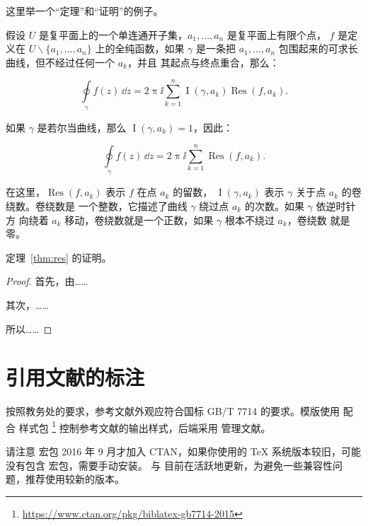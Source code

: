 \documentclass{sjtureport}
\begin{document}
这里举一个“定理”和“证明”的例子。
\begin{theorem}[留数定理]
\label{thm:res}
	假设 $U$ 是复平面上的一个单连通开子集，$a_1, \ldots, a_n$ 是复平面上有限个点，
	$f$ 是定义在 $U \backslash \{a_1, \ldots, a_n\}$ 上的全纯函数，如果 $\gamma$
	是一条把 $a_1, \ldots, a_n$ 包围起来的可求长曲线，但不经过任何一个 $a_k$，并且
	其起点与终点重合，那么：

	\begin{equation}
	\label{eq:res}
	\oint\limits_\gamma f(z)\, \dd z = 2\uppi \ii \sum_{k=1}^n \operatorname{I}(\gamma, a_k) \operatorname{Res}(f, a_k).
	\end{equation}

	如果 $\gamma$ 是若尔当曲线，那么 $\operatorname{I}(\gamma, a_k) = 1$，因此：

	\begin{equation}
	\label{eq:resthm}
	\oint\limits_\gamma f(z)\, \dd z = 2\uppi \ii \sum_{k=1}^n \operatorname{Res}(f, a_k).
	\end{equation}

	在这里，$\operatorname{Res}(f, a_k)$ 表示 $f$ 在点 $a_k$ 的留数，
	$\operatorname{I}(\gamma, a_k)$ 表示 $\gamma$ 关于点 $a_k$ 的卷绕数。卷绕数是
	一个整数，它描述了曲线 $\gamma$ 绕过点 $a_k$ 的次数。如果 $\gamma$ 依逆时针方
	向绕着 $a_k$ 移动，卷绕数就是一个正数，如果 $\gamma$ 根本不绕过 $a_k$，卷绕数
	就是零。

	定理~\ref{thm:res} 的证明。

	\begin{proof}
	首先，由……

	其次，……

	所以……
	\end{proof}
\end{theorem}

\section{引用文献的标注}

按照教务处的要求，参考文献外观应符合国标 GB/T 7714 的要求。模版使用 \BibLaTeX{}
配合  样式包%
\footnote{\url{https://www.ctan.org/pkg/biblatex-gb7714-2015}}%
控制参考文献的输出样式，后端采用  管理文献。

请注意  宏包 2016 年 9 月才加入 CTAN，如果你使用的
\TeX{} 系统版本较旧，可能没有包含  宏包，需要手动安装。
\BibLaTeX{} 与  目前在活跃地更新，为避免一些兼容性问
题，推荐使用较新的版本。
\end{document}
